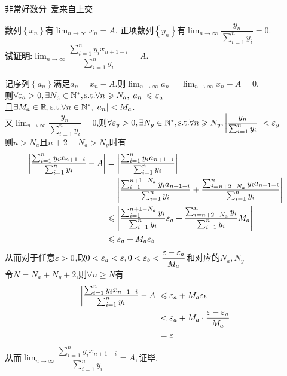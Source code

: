 \documentclass{ctexart}
\begin{document}
\pagestyle{empty}
\begin{center}\large 非常好数分\ 爱来自上交\end{center}
\begin{problem}[1.]
    数列$\left\{ x_n\right\}$有$\displaystyle\lim_{n\to\infty}{x_n}=A$.
    正项数列$\left\{ y_n\right\}$有$\displaystyle\lim_{n\to\infty}\dfrac{y_n}{\sum_{i=1}^{n}{y_i}}=0$.\\
    \textbf{试证明:}$\displaystyle\lim_{n\to\infty}{\dfrac{\sum_{i=1}^{n}{y_ix_{n+1-i}}}{\sum_{i=1}^{n}{y_i}}}=A.$
\end{problem}
\begin{solution}[Proof.]
    记序列$\left\{ a_n\right\}$满足$a_n=x_n-A$.则$\displaystyle\lim_{n\to\infty}{a_n}=\lim_{n\to\infty}{x_n}-A=0$.\\
    则$\forall \varepsilon_a>0,\exists N_a\in\mathbb{N}^*,\text{s.t.}\forall n\geqslant N_a,\left\lvert a_n\right\rvert\leqslant\varepsilon_a$\\
    且$\exists M_a\in\mathbb{R},\text{s.t.}\forall n\in\mathbb{N}^*,\left|a_n\right|<M_a$.\\
    又$\displaystyle\lim_{n\to\infty}\dfrac{y_n}{\sum_{i=1}^{n}{y_i}}=0$,则$\forall\varepsilon_y>0,\exists N_y\in\mathbb{N}^*,\text{s.t.}\forall n\geqslant N_y,\left|\dfrac{y_n}{\sum_{i=1}^{n}{y_i}}\right|<\varepsilon_y$\\
    则$n>N_a$且$n+2-N_a>N_y$时有\begin{align*}
        \left|\dfrac{\sum_{i=1}^{n}{y_ix_{n+1-i}}}{\sum_{i=1}^{n}{y_i}}-A\right|
        &= \left|\dfrac{\sum_{i=1}^{n}{y_ia_{n+1-i}}}{\sum_{i=1}^{n}{y_i}}\right| \\
        &= \left|\dfrac{\sum_{i=1}^{n+1-N_a}{y_ia_{n+1-i}}}{\sum_{i=1}^{n}{y_i}}+\dfrac{\sum_{i=n+2-N_a}^{n}{y_ia_{n+1-i}}}{\sum_{i=1}^{n}{y_i}}\right| \\
        &\leqslant \left|\dfrac{\sum_{i=1}^{n+1-N_a}{y_i}}{\sum_{i=1}^{n}{y_i}}\varepsilon_a+\dfrac{\sum_{i=n+2-N_a}^{n}{y_i}}{\sum_{i=1}^{n}{y_i}}M_a\right| \\
        &\leqslant \varepsilon_a+M_a\varepsilon_b 
    \end{align*}
    从而对于任意$\varepsilon>0$,取$0<\varepsilon_a<\varepsilon,0<\varepsilon_b<\dfrac{\varepsilon-\varepsilon_a}{M_a}$和对应的$N_a,N_y$\\
    令$N=N_a+N_y+2$,则$\forall n\geqslant N$有\begin{align*}
        \left|\dfrac{\sum_{i=1}^{n}{y_ix_{n+1-i}}}{\sum_{i=1}^{n}{y_i}}-A\right|
        &\leqslant \varepsilon_a+M_a\varepsilon_b \\
        &< \varepsilon_a+M_a\cdot\dfrac{\varepsilon-\varepsilon_a}{M_a} \\
        &= \varepsilon
    \end{align*}
    从而$\displaystyle\lim_{n\to\infty}{\dfrac{\sum_{i=1}^{n}{y_ix_{n+1-i}}}{\sum_{i=1}^{n}{y_i}}}=A,$证毕.
\end{solution}
\end{document}
